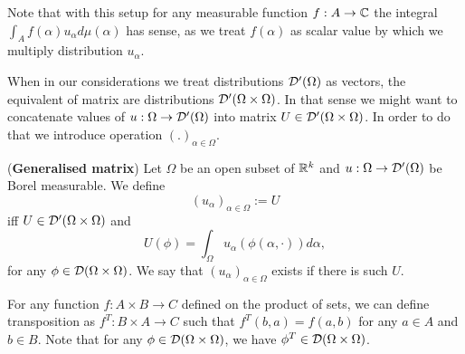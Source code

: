 \documentclass[main.tex]{subfiles}
\begin{document}
Note that with this setup for any measurable function $f:A\to \mathbb{C}$ the integral $\int_A f(\alpha)u_\alpha d\mu(\alpha)$ has sense, as we treat $f(\alpha)$ as scalar value by which we multiply distribution $u_\alpha$.

When in our considerations we treat distributions $\mathcal{D}'(\Omega)$ as vectors, the equivalent of matrix are distributions $\mathcal{D}'(\Omega\times\Omega)$. In that sense we might want to concatenate values of $u:\Omega\to\mathcal{D}'(\Omega)$ into matrix $U\in \mathcal{D}'(\Omega\times\Omega)$. In order to do that we introduce operation $(.)_{\alpha\in\Omega}$.

\begin{definition} (\textbf{Generalised matrix})
\label{generalised-matrix}
Let $\Omega$ be an open subset of $\mathbb{R}^k$ and $u:\Omega\to\mathcal{D}'(\Omega)$ 
be Borel measurable. We define
\begin{equation}
(u_\alpha)_{\alpha\in\Omega} := U
\end{equation}
iff $U\in\mathcal{D}'(\Omega\times\Omega)$ and
\begin{equation}
U(\phi) = \int_\Omega u_\alpha(\phi(\alpha, \cdot))d\alpha,
\end{equation}
for any $\phi\in \mathcal{D}(\Omega\times\Omega)$.
We say that $(u_\alpha)_{\alpha\in\Omega}$ exists if there is such $U$.
\end{definition}

For any function $f:A\times B \to C$ defined on the product of sets, we can define transposition as $f^T:B\times A \to C$ such that $f^T(b, a) = f(a,b)$ for any $a\in A$ and $b\in B$. Note that for any $\phi\in\mathcal{D}(\Omega\times\Omega)$, we have $\phi^T\in\mathcal{D}(\Omega\times\Omega)$.
\end{document}
